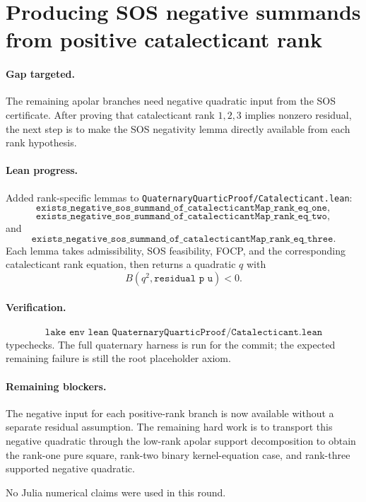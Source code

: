 \documentclass[11pt]{article}
\begin{document}
\section*{Producing SOS negative summands from positive catalecticant rank}

\paragraph{Gap targeted.}
The remaining apolar branches need negative quadratic input from the SOS
certificate.  After proving that catalecticant rank \(1,2,3\) implies nonzero
residual, the next step is to make the SOS negativity lemma directly available
from each rank hypothesis.

\paragraph{Lean progress.}
Added rank-specific lemmas to
\texttt{QuaternaryQuarticProof/Catalecticant.lean}:
\[
\texttt{exists\_negative\_sos\_summand\_of\_catalecticantMap\_rank\_eq\_one},
\]
\[
\texttt{exists\_negative\_sos\_summand\_of\_catalecticantMap\_rank\_eq\_two},
\]
and
\[
\texttt{exists\_negative\_sos\_summand\_of\_catalecticantMap\_rank\_eq\_three}.
\]
Each lemma takes admissibility, SOS feasibility, FOCP, and the corresponding
catalecticant rank equation, then returns a quadratic \(q\) with
\[
B(q^2,\texttt{residual p u})<0.
\]

\paragraph{Verification.}
\[
\texttt{lake env lean QuaternaryQuarticProof/Catalecticant.lean}
\]
typechecks.  The full quaternary harness is run for the commit; the expected
remaining failure is still the root placeholder axiom.

\paragraph{Remaining blockers.}
The negative input for each positive-rank branch is now available without a
separate residual assumption.  The remaining hard work is to transport this
negative quadratic through the low-rank apolar support decomposition to obtain
the rank-one pure square, rank-two binary kernel-equation case, and rank-three
supported negative quadratic.

No Julia numerical claims were used in this round.
\end{document}
